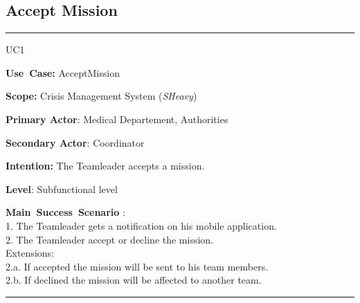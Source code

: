 \subsection{Accept Mission}
\vspace{0.5cm}
\hrule
\vspace{0.5cm}
\begin{lyxlist}{UC1}
\small{
\item [\textbf{Use~Case:}] AcceptMission
\item [\textbf{Scope:}] Crisis Management System (\emph{SHeavy})
\item [\textbf{Primary Actor}:] Medical Departement, Authorities
\item [\textbf{Secondary Actor}:] Coordinator
\item [\textbf{Intention:}]The Teamleader accepts a mission.
\item [\textbf{Level}:]Subfunctional level
\item [\textbf{Main~Success~Scenario}]:\\
1. The Teamleader gets a notification on his mobile application.\\
2. The Teamleader accept or decline the mission.\\
Extensions:\\
	2.a. If accepted the mission will be sent to his team members.\\
	2.b. If declined the mission will be affected to another team.\\ 

}
\end{lyxlist}
\hrule 
\vspace{0.5cm} 


